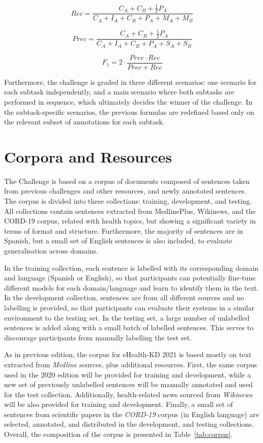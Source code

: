 \documentclass[a4paper,11pt,twocolumn,twoside]{article}
\begin{document}
$$Rec = \frac{C_A + C_B + \frac{1}{2} P_A}{C_A + I_A + C_B + P_A + M_A + M_B}$$

$$Prec = \frac{C_A + C_B + \frac{1}{2} P_A}{C_A + I_A + C_B + P_A + S_A + S_B}$$

$$F_1 = 2 \cdot \frac{Prec \cdot Rec}{Prec + Rec}$$

Furthermore, the challenge is graded in three different scenarios:
one scenario for each subtask independently, and a main scenario where both subtasks are performed in sequence, which ultimately decides the winner of the challenge.
In the subtask-specific scenarios, the previous formulas are redefined based only on the relevant subset of annotations for each subtask.

\section{Corpora and Resources}\label{sec:resources}

The Challenge is based on a corpus of documents composed of
sentences taken from previous challenges and other resources,
and newly annotated sentences.
The corpus is divided into three collections: training, development, and testing.
All collections contain sentences extracted from MedlinePlus, Wikinews, and the CORD-19 corpus, related with health topics, but showing a significant variety in terms of format and structure.
Furthermore, the majority of sentences are in Spanish, but a small set of English sentences is also included, to evaluate generalisation across domains.

In the training collection, each sentence is labelled with its corresponding domain and language (Spanish or English), so that participants can potentially fine-tune different models for each domain/language and learn to identify them in the text.
In the development collection, sentences are from all different sources and no labelling is provided, so that participants can evaluate their systems in a similar environment to the testing set.
In the testing set, a large number of unlabelled sentences is added along with a small batch of labelled sentences. This serves to discourage participants from manually labelling the test set.

As in previous edition, the corpus for eHealth-KD 2021 is based mostly on text extracted from \textit{Medline} sources, plus additional resources.
First, the same corpus used in the 2020 edition will be provided for training and development, while a new set of previously unlabelled sentences will be manually annotated and used for the test collection. Additionally, health-related news sourced from \textit{Wikinews} will be also provided for training and development.
Finally, a small set of sentences from scientific papers in the \textit{CORD-19} corpus (in English language) are selected, annotated, and distributed in the development, and testing collections. Overall, the composition of the corpus is presented in Table~\ref{tab:corpus}.
\end{document}

